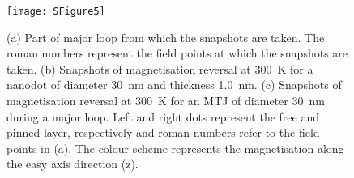 \documentclass[aps,prb,signlecolumn,preprint,superscriptaddress,10]{revtex4-1}
\begin{document}
\begin{figure}[!tb]
	\centering
	\texttt{[image: SFigure5]}
	\caption{(a) Part of major loop from which the snapshots are taken. The roman numbers represent the field points at which the snapshots are taken. (b) Snapshots of magnetisation reversal at 300~K for a nanodot of diameter 30~nm and thickness 1.0~nm. (c) Snapshots of magnetisation reversal at 300~K for an MTJ of diameter 30~nm during a major loop. Left and right dots represent the free and pinned layer, respectively and roman numbers refer to the field points in (a). The colour scheme represents the magnetisation along the easy axis direction (z).}
	\label{fig:SFigure5}
\end{figure}
%
\end{document}
